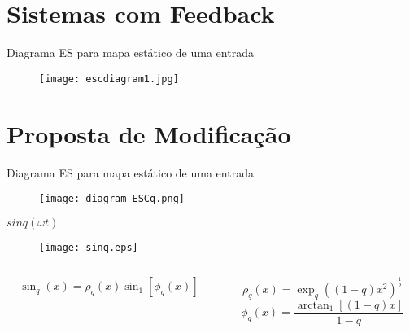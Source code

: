 \documentclass{beamer}
\begin{document}
\section{Sistemas com Feedback}
\begin{frame}
\begin{block}{Diagrama ES para mapa estático de uma entrada}
\begin{figure}[ht]
\begin{center}
\texttt{[image: escdiagram1.jpg]}
\end{center}
\end{figure}
 \end{block}
\end{frame}


\section{Proposta de Modificação}

\begin{frame}
\begin{block}{Diagrama ES para mapa estático de uma entrada}
\begin{figure}[ht]
\begin{center}
\texttt{[image: diagram\_ESCq.png]}
\end{center}
\end{figure}
 \end{block}
\end{frame}

\begin{frame}{$sinq(\omega t)$}
\begin{block}{}
\begin{figure}[ht] 
    \texttt{[image: sinq.eps]} 
    \end{figure}
\end{block}
\begin{columns}
\begin{column}{5cm}
\begin{block}{}
\begin{equation}
\sin_q(x) = \rho_q(x)\sin_1[\phi_q(x)] \nonumber
\end{equation}
\end{block}
\end{column}
\begin{column}{5cm}
\begin{block}{}
\begin{equation}
\rho_q(x)={\exp_q((1-q)x^2)}^{\frac{1}{2}} \nonumber
\end{equation}
\begin{equation}
\phi_q(x) = \frac{\arctan_1[(1-q)x]}{1-q}\nonumber
\end{equation}
\end{block}	
\end{column}
\end{columns}
\end{frame}
\end{document}
